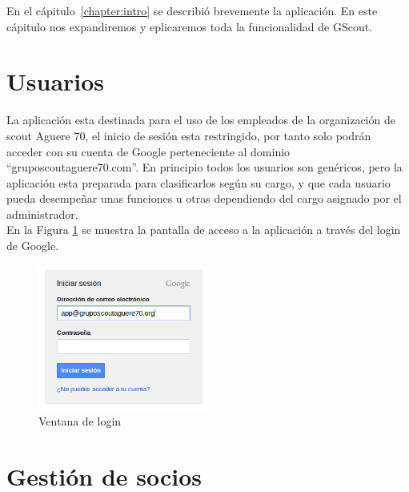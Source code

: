 
En el cápitulo~\ref{chapter:intro} se describió brevemente la aplicación. En este cápitulo nos expandiremos y eplicaremos toda la funcionalidad de GScout.\\

\section{Usuarios}
\label{3:sec1}

La aplicación esta destinada para el uso de los empleados de la organización de scout Aguere 70, el inicio de sesión esta restringido, por tanto solo podrán 
acceder con su cuenta de Google perteneciente al dominio ``gruposcoutaguere70.com''. En principio todos los usuarios son genéricos, pero la aplicación esta preparada
para clasificarlos según su cargo, y que cada usuario pueda desempeñar unas funciones u otras dependiendo del cargo asignado por el administrador.\\

En la Figura \ref{fig:login} se muestra la pantalla de acceso a la aplicación a través del login de Google.


\begin{figure}[H]
\begin{center}
\includegraphics[width=0.5\textwidth]{images/login.jpg}
\caption{Ventana de login}
\label{fig:login}
\end{center}
\end{figure}


\section{Gestión de socios}
\label{3:sec2}

